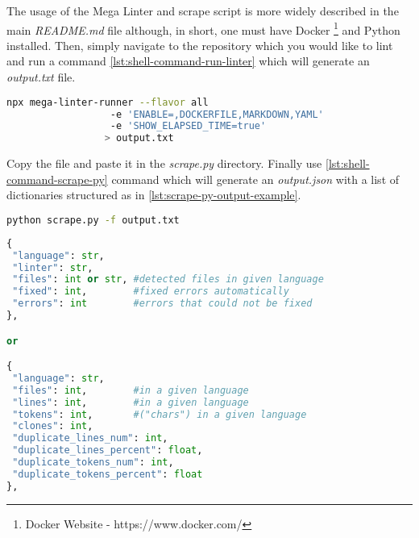 The usage of the Mega Linter and scrape script is more widely described in the main \emph{README.md} file although, in short, one must have Docker \footnote{Docker Website - https://www.docker.com/} and Python installed. Then, simply navigate to the repository which you would like to lint and run a command \ref{lst:shell-command-run-linter} which will generate an \emph{output.txt} file.

\begin{lstlisting}[language=Bash, label={lst:shell-command-run-linter}]
npx mega-linter-runner --flavor all
                  -e 'ENABLE=,DOCKERFILE,MARKDOWN,YAML'
                  -e 'SHOW_ELAPSED_TIME=true'
                 > output.txt
\end{lstlisting}

Copy the file and paste it in the \emph{scrape.py} directory. Finally use \ref{lst:shell-command-scrape-py} command which will generate an \emph{output.json} with a list of dictionaries structured as in \ref{lst:scrape-py-output-example}.

\begin{lstlisting}[language=Bash, label={lst:shell-command-scrape-py}]
python scrape.py -f output.txt
\end{lstlisting}

\begin{lstlisting}[language=Python, label={lst:scrape-py-output-example}]
{
 "language": str,
 "linter": str,
 "files": int or str, #detected files in given language
 "fixed": int,        #fixed errors automatically
 "errors": int        #errors that could not be fixed
},

or

{
 "language": str,
 "files": int,        #in a given language
 "lines": int,        #in a given language
 "tokens": int,       #("chars") in a given language
 "clones": int,
 "duplicate_lines_num": int,
 "duplicate_lines_percent": float,
 "duplicate_tokens_num": int,
 "duplicate_tokens_percent": float
},
\end{lstlisting}
